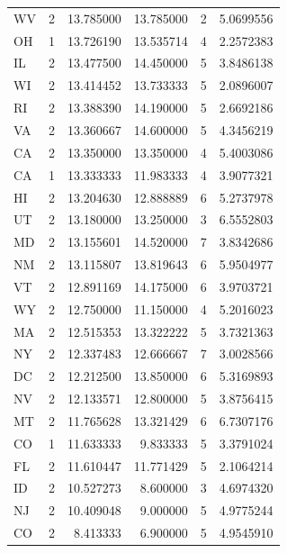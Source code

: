 \documentclass[
  letterpaper,
  DIV=11,
  numbers=noendperiod]{scrartcl}
\begin{document}
\begin{longtable}[t]{lrrrrr}
WV & 2 & 13.785000 & 13.785000 & 2 & 5.0699556\\
OH & 1 & 13.726190 & 13.535714 & 4 & 2.2572383\\
\addlinespace
IL & 2 & 13.477500 & 14.450000 & 5 & 3.8486138\\
WI & 2 & 13.414452 & 13.733333 & 5 & 2.0896007\\
RI & 2 & 13.388390 & 14.190000 & 5 & 2.6692186\\
VA & 2 & 13.360667 & 14.600000 & 5 & 4.3456219\\
CA & 2 & 13.350000 & 13.350000 & 4 & 5.4003086\\
\addlinespace
CA & 1 & 13.333333 & 11.983333 & 4 & 3.9077321\\
HI & 2 & 13.204630 & 12.888889 & 6 & 5.2737978\\
UT & 2 & 13.180000 & 13.250000 & 3 & 6.5552803\\
MD & 2 & 13.155601 & 14.520000 & 7 & 3.8342686\\
NM & 2 & 13.115807 & 13.819643 & 6 & 5.9504977\\
\addlinespace
VT & 2 & 12.891169 & 14.175000 & 6 & 3.9703721\\
WY & 2 & 12.750000 & 11.150000 & 4 & 5.2016023\\
MA & 2 & 12.515353 & 13.322222 & 5 & 3.7321363\\
NY & 2 & 12.337483 & 12.666667 & 7 & 3.0028566\\
DC & 2 & 12.212500 & 13.850000 & 6 & 5.3169893\\
\addlinespace
NV & 2 & 12.133571 & 12.800000 & 5 & 3.8756415\\
MT & 2 & 11.765628 & 13.321429 & 6 & 6.7307176\\
CO & 1 & 11.633333 & 9.833333 & 5 & 3.3791024\\
FL & 2 & 11.610447 & 11.771429 & 5 & 2.1064214\\
ID & 2 & 10.527273 & 8.600000 & 3 & 4.6974320\\
\addlinespace
NJ & 2 & 10.409048 & 9.000000 & 5 & 4.9775244\\
CO & 2 & 8.413333 & 6.900000 & 5 & 4.9545910\\
\bottomrule
\end{longtable}
\end{document}
